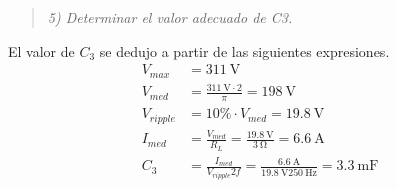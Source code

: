 \begin{quote} \textit{5) Determinar el valor adecuado de C3.}
\end{quote}
 El valor de $C_3$ se dedujo a partir de las siguientes expresiones.
\begin{align*}
	V_{max}  &=\SI{311}{\volt} \\
	V_{med}  & = \frac{\SI{311}{\volt}\cdot 2}{\pi} = \SI{198}{\volt} \\
	V_{ripple} &= 10\% \cdot V_{med} = \SI{19.8}{\volt}\\
	I_{med} &= \frac{V_{med}}{R_L} = \frac{\SI{19.8}{\volt}}{\SI{3}{\ohm}} = \SI{6.6}{\ampere} \\
	C_3 &= \frac{I_{med}}{V_{ripple}2f} = \frac{\SI{6.6}{\ampere}}{\SI{19.8}{\volt}2 \SI{50}{\hertz}} = \boxed{\SI{3.3}{\milli\farad}} \\
\end{align*}

